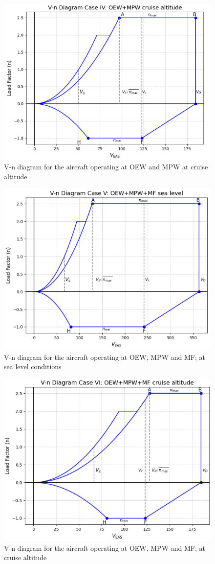 \begin{figure}[H]
    \centering
    \includegraphics[width=0.65\linewidth]{figures/v-n diagram case IV.png}
    \caption{V-n diagram for the aircraft operating at OEW and MPW at cruise altitude}
    \label{fig:v-n_case4}
\end{figure}

\begin{figure}[H]
    \centering
    \includegraphics[width=0.65\linewidth]{figures/v-n diagram case V.png}
    \caption{V-n diagram for the aircraft operating at OEW, MPW and MF; at sea level conditions} 
    \label{fig:v-n_case5}
\end{figure}

\begin{figure}[H]
    \centering
    \includegraphics[width=0.65\linewidth]{figures/v-n diagram case VI.png}
    \caption{V-n diagram for the aircraft operating at OEW, MPW and MF; at cruise altitude}
    \label{fig:v-n_case6}
\end{figure}